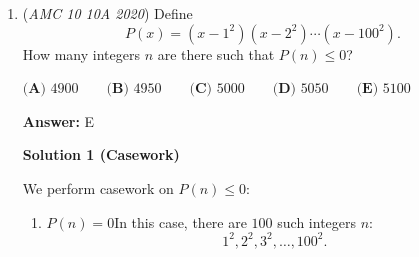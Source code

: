\begin{enumerate}
 The total area of the bounding $2020 \times 2020$ square is $2020^2$. Therefore, the probability is the ratio of the favorable area to the total area:$\dfrac{2020^2 \pi d^2}{2020^2} = \pi d^2$.

 We are given that the probability is $\dfrac{1}{2}$, so we equate and solve:$\pi d^2 = \dfrac{1}{2} \implies d^2 = \dfrac{1}{2\pi}$.

 Solving for $d$ gives $d = \sqrt{\dfrac{1}{2\pi}} \approx \sqrt{0.159}$. Since $0.4^2 = 0.16$, we can clearly see that $d \approx 0.4$.

 by chundoowan

 Education, The Study of Everything

 


	\item (\textit{AMC 10 10A 2020}) Define
 \[P(x) =(x-1^2)(x-2^2)\cdots(x-100^2).\]How many integers $n$ are there such that $P(n)\leq 0$?


 $\textbf{(A) } 4900 \qquad \textbf{(B) } 4950\qquad \textbf{(C) } 5000\qquad \textbf{(D) } 5050 \qquad \textbf{(E) } 5100$

 \textbf{Answer: }E



\textbf{Solution 1 (Casework)}

We perform casework on $P(n)\leq0:$

            \begin{enumerate} 
        \item $P(n)=0$In this case, there are $100$ such integers $n:$ 
 \[1^2,2^2,3^2,\ldots,100^2.\]


\end{enumerate}
\end{enumerate}
